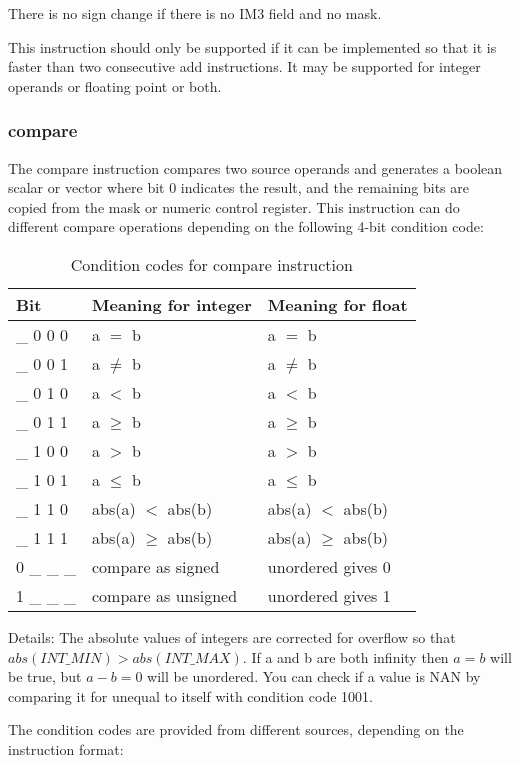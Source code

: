 \documentclass[forwardcom.tex]{subfiles}
\begin{document}
There is no sign change if there is no IM3 field and no mask. 
\vspace{2mm}

This instruction should only be supported if it can be implemented so that it is faster than two consecutive add instructions. It may be supported for integer operands or floating point or both.

\subsubsection{compare} \label{compare}
The compare instruction compares two source operands and generates a boolean scalar or vector where bit 0 indicates the result, and the remaining bits are copied from the mask or numeric control register. This instruction can do different compare operations depending on the following 4-bit condition code:

\begin{longtable} {|p{14mm}|p{55mm}|p{55mm}|}
\caption{Condition codes for compare instruction} 
\label{table:conditionCodesForCompareInstruction} \\
\endfirsthead
\endhead
\hline
\bfseries Bit & \bfseries Meaning for integer & \bfseries Meaning for float \\
\hline
\_ 0 0 0 & a $=$ b & a $=$ b \\
\_ 0 0 1 & a $\neq$ b & a $\neq$ b \\
\_ 0 1 0 & a $<$ b & a $<$ b \\
\_ 0 1 1 & a $\geq$ b & a $\geq$ b \\
\_ 1 0 0 & a $>$ b & a $>$ b \\
\_ 1 0 1 & a $\leq$ b & a $\leq$ b \\
\_ 1 1 0 & abs(a) $<$ abs(b) & abs(a) $<$ abs(b) \\
\_ 1 1 1 & abs(a) $\geq$ abs(b) & abs(a) $\geq$ abs(b) \\
\hline
0 \_ \_ \_ & compare as signed & unordered gives 0 \\
1 \_ \_ \_ & compare as unsigned & unordered gives 1 \\
\hline
\end{longtable}
Details: The absolute values of integers are corrected for overflow so that $abs(INT\_MIN) > abs(INT\_MAX)$.
If a and b are both infinity then $a = b$ will be true, but $a-b = 0$ will be unordered.
You can check if a value is NAN by comparing it for unequal to itself with condition code 1001.

\vspace{2mm}
The condition codes are provided from different sources, depending on the instruction format:
\end{document}
